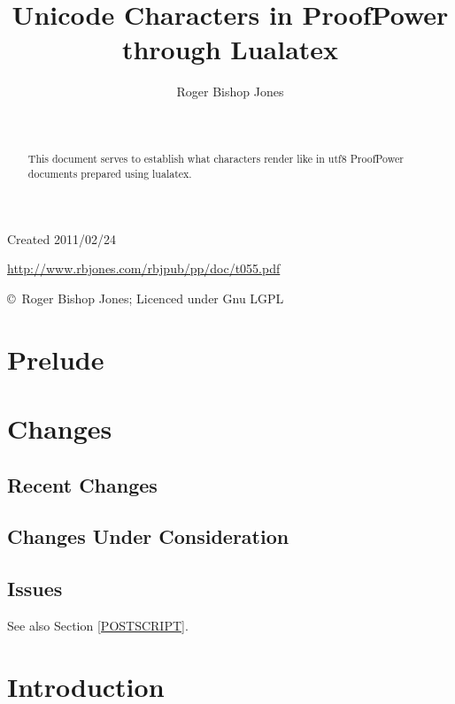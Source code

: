 \documentclass[11pt]{article}
\title{Unicode Characters in ProofPower through Lualatex}
\author{Roger Bishop Jones}
\date{\ }
\begin{document}
\begin{titlepage}
\maketitle
\begin{abstract}
This document serves to establish what characters render like in utf8 ProofPower documents prepared using lualatex.
\end{abstract}
\vfill

\begin{centering}
{\footnotesize

Created 2011/02/24



\href{http://www.rbjones.com/rbjpub/pp/doc/t055.pdf}
{http://www.rbjones.com/rbjpub/pp/doc/t055.pdf}

\copyright\ Roger Bishop Jones; Licenced under Gnu LGPL

}%
\end{centering}

\thispagestyle{empty}
\end{titlepage}

\newpage
\addtocounter{page}{1}
{\parskip=0pt\tableofcontents}

\section{Prelude}


\section{Changes}

\subsection{Recent Changes}


\subsection{Changes Under Consideration}


\subsection{Issues}

See also Section \ref{POSTSCRIPT}.

\section{Introduction}
\end{document}
